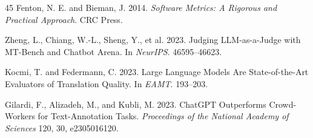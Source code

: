 \documentclass[sigconf,review,anonymous,nonacm]{acmart}
\begin{document}
\begin{thebibliography}{45}
Fenton, N. E. and Bieman, J. 2014. \textit{Software Metrics: A Rigorous and Practical Approach}. CRC Press.

Zheng, L., Chiang, W.-L., Sheng, Y., et al. 2023. Judging LLM-as-a-Judge with MT-Bench and Chatbot Arena. In \textit{NeurIPS}. 46595--46623.

Kocmi, T. and Federmann, C. 2023. Large Language Models Are State-of-the-Art Evaluators of Translation Quality. In \textit{EAMT}. 193--203.

Gilardi, F., Alizadeh, M., and Kubli, M. 2023. ChatGPT Outperforms Crowd-Workers for Text-Annotation Tasks. \textit{Proceedings of the National Academy of Sciences} 120, 30, e2305016120.

\end{thebibliography}
\end{document}
